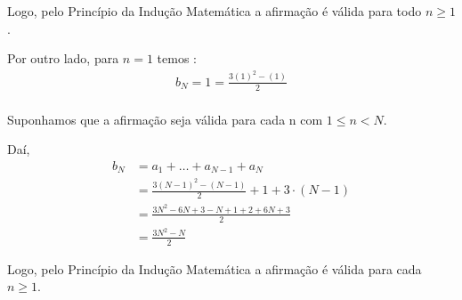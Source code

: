     Logo, pelo Princípio da Indução Matemática a afirmação é válida para todo $n \ge 1$.

    Por outro lado, para $n = 1$ temos : 
    \begin{align*}
    b_{N} = 1 = \frac{3(1)^2 - (1)}{2} \\
    \end{align*}

    Suponhamos que a afirmação seja válida para cada n com $1 \leq n < N$.

    Daí,
    \begin{align*}
    b_{N} &= a_1 + \dotsc + a_{N-1} + a_{N} \\
    &= \frac{3(N-1)^2 - (N-1)}{2} + 1 + 3 \cdot (N - 1) \\
    &= \frac{ 3N^{2} -6N + 3 -N + 1 + 2 + 6N + 3 }{2} \\
    &= \frac{3N^{2} - N}{2}
    \end{align*}

    Logo, pelo Princípio da Indução Matemática a afirmação é válida para cada $n \ge 1$.
